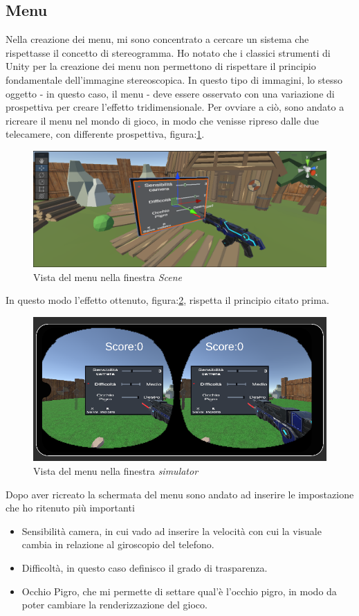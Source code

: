 \documentclass[
a4paper,
cleardoublepage=empty,
headings=twolinechapter,
numbers=autoenddot,
]{scrbook}
\begin{document}
	\subsection{Menu}
	Nella creazione dei menu, mi sono concentrato a cercare un sistema che rispettasse il concetto di stereogramma\cite{Stereogramma}. Ho notato che i classici strumenti di Unity per la creazione dei menu non permettono di rispettare il principio fondamentale dell'immagine stereoscopica. In questo tipo di immagini, lo stesso oggetto - in questo caso, il menu - deve essere osservato con una variazione di prospettiva per creare l'effetto tridimensionale.
	Per ovviare a ciò, sono andato a ricreare il menu nel mondo di gioco, in modo che venisse ripreso dalle due telecamere, con differente prospettiva, figura:\ref{fig:menu_scena}.
	\begin{figure}[h]
		\centering
		\includegraphics[width=0.6\linewidth]{image/menu_scena}
		\caption{Vista del menu nella finestra \textit{Scene}}
		\label{fig:menu_scena}
	\end{figure}
	In questo modo l'effetto ottenuto, figura:\ref{fig:menu_simulator}, rispetta il principio citato prima.
	\begin{figure}[h]
		\centering
		\includegraphics[width=0.6\linewidth]{image/menu_simulatore}
		\caption{Vista del menu nella finestra \textit{simulator}}
		\label{fig:menu_simulator}
	\end{figure}
	Dopo aver ricreato la schermata del menu sono andato ad inserire le impostazione che ho ritenuto più importanti
	\begin{itemize}
		\item Sensibilità camera, in cui vado ad inserire la velocità con cui la visuale cambia in relazione al giroscopio del telefono.
		\item Difficoltà, in questo caso definisco il grado di trasparenza. 
		\item Occhio Pigro, che mi permette di settare qual'è l'occhio pigro, in modo da poter cambiare la renderizzazione del gioco.
	\end{itemize}
\end{document}
